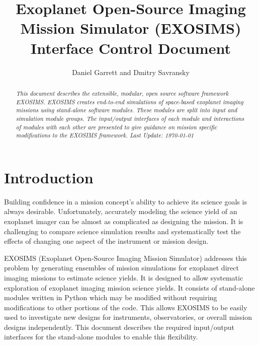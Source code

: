 \documentclass[cleanfoot]{asme2ej}
\title{Exoplanet Open-Source Imaging Mission Simulator (EXOSIMS) \\ Interface Control Document}
\author{Daniel Garrett and Dmitry Savransky
    \affiliation{
    Sibley School of Mechanical and Aerospace Engineering\\
	Cornell University\\
	Ithaca, NY 14853
    }	
}
\begin{document}
\maketitle    

\begin{abstract}
{\it This document describes the extensible, modular, open source software framework EXOSIMS.  EXOSIMS creates end-to-end simulations of space-based exoplanet imaging missions using stand-alone software modules.  These modules are split into input and simulation module groups.  The input/output interfaces of each module and interactions of modules with each other are presented to give guidance on mission specific modifications to the EXOSIMS framework. Last Update: \today}
\end{abstract}

\tableofcontents

\begin{nomenclature}
\end{nomenclature}


\section{Introduction} 
Building confidence in a mission concept's ability to achieve its science goals is always desirable.  Unfortunately, accurately modeling the science yield of an exoplanet imager can be almost as complicated as designing the mission.  It is challenging to compare science simulation results and systematically test the effects of changing one aspect of the instrument or mission design.

EXOSIMS (Exoplanet Open-Source Imaging Mission Simulator) addresses this problem by generating ensembles of mission simulations for exoplanet direct imaging missions to estimate science yields. It is designed to allow systematic exploration of exoplanet imaging mission science yields.  It consists of stand-alone modules written in Python which may be modified without requiring modifications to other portions of the code. This allows EXOSIMS to be easily used to investigate new designs for instruments, observatories, or overall mission designs independently. This document describes the required input/output interfaces for the stand-alone modules to enable this flexibility.
\end{document}
